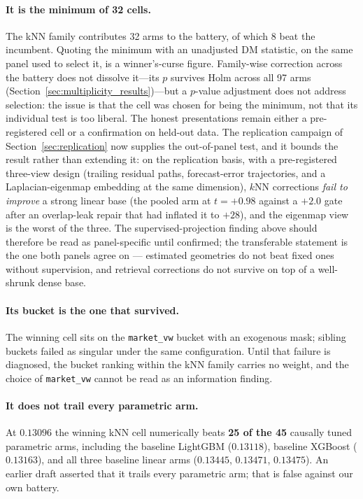 \paragraph{It is the minimum of 32 cells.} The kNN family contributes 32 arms
to the battery, of which 8 beat the incumbent. Quoting the minimum with an
unadjusted DM statistic, on the same panel used to select it, is a
winner's-curse figure. Family-wise correction across the battery does not
dissolve it---its $p$ survives Holm across all 97 arms
(Section~\ref{sec:multiplicity_results})---but a $p$-value adjustment does not
address selection: the issue is that the cell was chosen for being the minimum,
not that its individual test is too liberal. The honest presentations remain
either a pre-registered cell or a confirmation on held-out data. The
replication campaign of Section~\ref{sec:replication} now supplies the
out-of-panel test, and it bounds the result rather than extending it: on the
replication basis, with a pre-registered three-view design (trailing residual
paths, forecast-error trajectories, and a Laplacian-eigenmap embedding at the
same dimension), $k$NN corrections \emph{fail to improve} a strong linear base
(the pooled arm at $t = +0.98$ against a $+2.0$ gate after an
overlap-leak repair that had inflated it to $+28$), and the eigenmap view is
the worst of the three. The supervised-projection finding above should
therefore be read as panel-specific until confirmed; the transferable statement
is the one both panels agree on --- estimated geometries do not beat fixed ones
without supervision, and retrieval corrections do not survive on top of a
well-shrunk dense base.

\paragraph{Its bucket is the one that survived.} The winning cell sits on the
\texttt{market\_vw} bucket with an exogenous mask; sibling buckets failed as
singular under the same configuration. Until that failure is diagnosed, the
bucket ranking within the kNN family carries no weight, and the choice of
\texttt{market\_vw} cannot be read as an information finding.

\paragraph{It does not trail every parametric arm.} At $0.13096$ the winning
kNN cell numerically beats \textbf{25 of the 45} causally tuned parametric
arms, including the baseline LightGBM ($0.13118$), baseline XGBoost
($0.13163$), and all three baseline linear arms ($0.13445$, $0.13471$,
$0.13475$). An earlier draft asserted that it trails every parametric arm; that
is false against our own battery.


